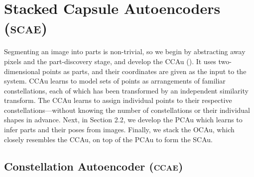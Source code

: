 \section{Stacked Capsule Autoencoders (\textsc{scae})}
\label{sec:caps_decoders}
Segmenting an image into parts is non-trivial, so we begin by abstracting away pixels and the part-discovery stage, and develop the \gls{CCAu} ().
It uses two-dimensional points as parts, and their coordinates are given as the input to the system. \Gls{CCAu} learns to model sets of points as arrangements of familiar constellations, each of which has been transformed by an independent similarity transform. The \gls{CCAu} learns to assign individual points to their respective constellations—without knowing the number of constellations or their individual shapes in advance.  Next, in Section 2.2, we develop the \gls{PCAu} which learns to infer parts and their poses from images. Finally, we stack the \gls{OCAu}, which closely resembles the \gls{CCAu}, on top of the \gls{PCAu} to form the \gls{SCAu}.



\subsection{Constellation Autoencoder (\textsc{ccae})}
\label{sec:constellation}

